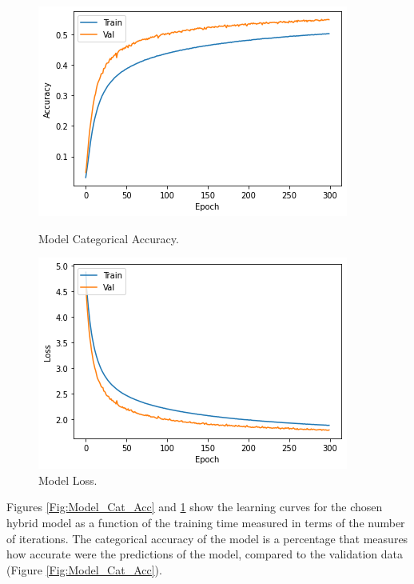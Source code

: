 \begin{figure}[!tbp]
  \centering
  \begin{minipage}[b]{0.45\textwidth}
    \includegraphics[width=\textwidth]{../Figures/accuracy_model}
    \caption{Model Categorical Accuracy.}
    \label{Fig:Model_Cat_Acc}
  \end{minipage}
  \hfill
  \begin{minipage}[b]{0.45\textwidth}
    \includegraphics[width=\textwidth]{../Figures/loss_model}
    \caption{Model Loss.}
    \label{Fig:Model_Loss}
  \end{minipage}
\end{figure}

Figures \ref{Fig:Model_Cat_Acc} and \ref{Fig:Model_Loss} show the learning curves for the chosen hybrid model as a function of the training time measured in terms of the number of iterations. The categorical accuracy of the model is a percentage that measures how accurate were the predictions of the model, compared to the validation data (Figure \ref{Fig:Model_Cat_Acc}).  

